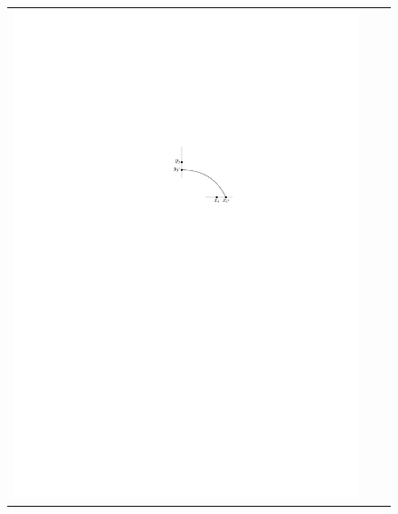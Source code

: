 \documentclass{patmorin}
\begin{document}
\begin{figure}
\begin{center}
\begin{tabular}{ccc}
       \includegraphics{figs/silly-2} &

\end{tabular}
\end{center}
\end{figure}
\end{document}
